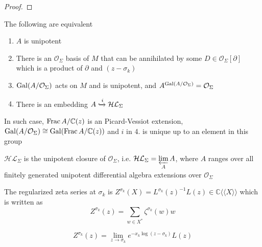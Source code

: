 \documentclass[main]{subfiles}
\begin{document}
\begin{proof}

\end{proof}

\begin{theorem}
The following are equivalent
\begin{enumerate}
\item $A$ is unipotent
\item There is an $\mathcal O_\Sigma$ basis of $M$ that can be annihilated by some $D\in\mathcal O_\Sigma[\partial]$ which is a product of $\partial$ and $(z-\sigma_k)$
\item $\operatorname{Gal}(A/\mathcal O_\Sigma)$ acts on $M$ and is unipotent, and $A^{\operatorname{Gal}(A/\mathcal O_\Sigma)}=\mathcal O_\Sigma$
\item There is an embedding $A\xhookrightarrow{i}\mathcal{HL}_\Sigma$
\end{enumerate}
In such case, $\operatorname{Frac} A/\mathbb C(z)$ is an Picard-Vessiot extension, $\operatorname{Gal}(A/\mathcal O_\Sigma)\cong\operatorname{Gal}(\operatorname{Frac} A/\mathbb C(z))$ and $i$ in 4. is unique up to an element in this group
\end{theorem}

\begin{corollary}
$\mathcal{HL}_\Sigma$ is the unipotent closure of $\mathcal O_\Sigma$, i.e. $\displaystyle\mathcal{HL}_\Sigma=\varprojlim_AA$, where $A$ ranges over all finitely generated unipotent differential algebra extensions over $\mathcal O_\Sigma$
\end{corollary}

\begin{definition}
The regularized zeta series at $\sigma_k$ is $Z^{\sigma_k}(X)=L^{\sigma_k}(z)^{-1}L(z)\in\mathbb C\langle\langle X\rangle\rangle$ which is written as
\[Z^{\sigma_k}(z)=\sum_{w\in X^*}\zeta^{\sigma_k}(w)w\]
\end{definition}

\begin{lemma}
\[Z^{\sigma_k}(z)=\lim_{z\to\sigma_k}e^{-x_k\log(z-\sigma_k)}L(z)\]
\end{lemma}
\end{document}
